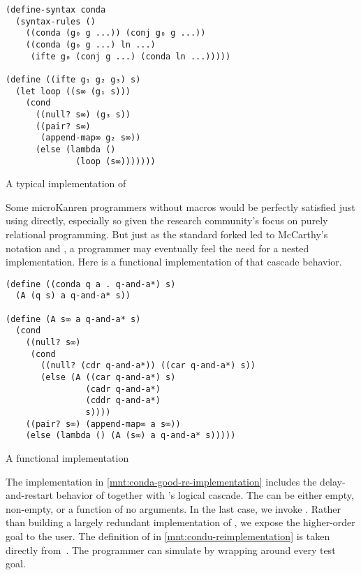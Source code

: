 \documentclass[sigplan,balance,pbalance,natbib=false]{acmart}
\begin{document}
\begin{listing}
  \begin{verbatim}
(define-syntax conda
  (syntax-rules ()
    ((conda (g₀ g ...)) (conj g₀ g ...))
    ((conda (g₀ g ...) ln ...)
     (ifte g₀ (conj g ...) (conda ln ...)))))

(define ((ifte g₁ g₂ g₃) s)
  (let loop ((s∞ (g₁ s)))
    (cond
      ((null? s∞) (g₃ s))
      ((pair? s∞)
       (append-map∞ g₂ s∞))
      (else (lambda ()
              (loop (s∞)))))))
  \end{verbatim}
  \caption{A typical implementation of }\label{mnt:conda-implementation}
\end{listing}

Some microKanren programmers without macros would be perfectly
satisfied just using  directly, especially so given
the research community's focus on purely relational programming. But
just as the standard forked  led to
McCarthy's  notation and , a
programmer may eventually feel the need for a nested implementation.
Here is a functional implementation of that cascade behavior.

\begin{listing}
  \begin{verbatim}
(define ((conda q a . q-and-a*) s)
  (A (q s) a q-and-a* s))

(define (A s∞ a q-and-a* s)
  (cond
    ((null? s∞)
     (cond
       ((null? (cdr q-and-a*)) ((car q-and-a*) s))
       (else (A ((car q-and-a*) s)
                (cadr q-and-a*)
                (cddr q-and-a*)
                s))))
    ((pair? s∞) (append-map∞ a s∞))
    (else (lambda () (A (s∞) a q-and-a* s)))))
  \end{verbatim}
  \caption{A functional  implementation}\label{mnt:conda-good-re-implementation}
\end{listing}

The implementation in \cref{mnt:conda-good-re-implementation} includes
the delay-and-restart behavior of  together
with 's logical cascade. The  can be
either empty, non-empty, or a function of no arguments. In the last
case, we invoke . Rather than building a largely
redundant implementation of , we expose the
higher-order goal  to the user. The definition
of  in \cref{mnt:condu-reimplementation} is taken
directly from~\cite{friedman2018reasoned}. The programmer can
simulate  by wrapping  around every
test goal.
\end{document}
